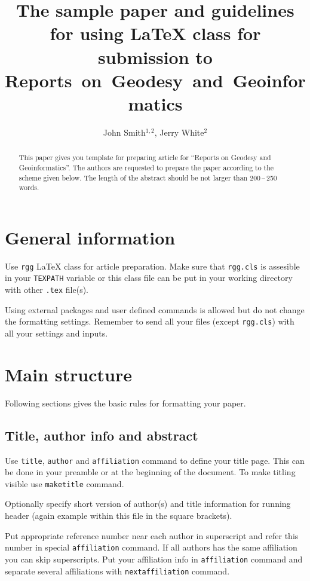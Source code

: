 \documentclass{rgg}
\title[The sample paper\ldots]{%
  The sample paper and guidelines for using \LaTeX{} class for submission to 
  Reports~on~Geodesy~and~Geoinformatics}
\author[Smith, J., White, J.]{John Smith$^{1,2}$, Jerry White$^2$}
\affiliation{%
  $^1$Department of Very Important Issues,\\
  Faculty of Even More Important Issues,\\
  Awesome University
  \nextaffiliation
  $^2$Department of Geodesy Affairs,\\
  Institute of Geodesy and Geoinformatics
}
\begin{document}
    \maketitle

    \begin{abstract}
      This paper gives you template for preparing article for ``Reports on 
      Geodesy and Geoinformatics''. The authors are requested to prepare the 
      paper according to the scheme given below. The length of the abstract 
      should be not larger than 200\,–\,250 words.
    \end{abstract}

  \section{General information}
    Use \texttt{rgg} \LaTeX{} class for article preparation.
    Make sure that \texttt{rgg.cls} is assesible in your
    \texttt{TEXPATH} variable or this class file can be put
    in your working directory with other \texttt{.tex} file(s).

    Using external packages and user defined commands is allowed
    but do not change the formatting settings.
    Remember to send all your files (except \texttt{rgg.cls}) 
    with all your settings and inputs.

  \section{Main structure}
    \label{labelforsection}

    Following sections gives the basic rules for formatting your
    paper.

  \subsection{Title, author info and abstract}
    Use \texttt{title}, \texttt{author} 
    and \texttt{affiliation} command
    to define your title page. This can be done
    in your preamble or at the beginning of the document.
    To make titling visible use \texttt{maketitle} command.

    Optionally specify short version of author(s) and title information
    for running header (again example within this file in the square brackets).

    Put appropriate reference number near each author in superscript
    and refer this number in special \texttt{affiliation} command.
    If all authors has the same affiliation you can skip superscripts.
    Put your affiliation info in \texttt{affiliation} command
    and separate several affiliations with \texttt{nextaffiliation} command.
\end{document}
